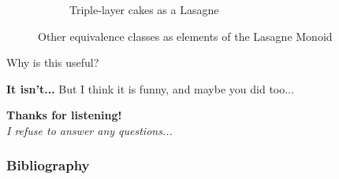 \documentclass{beamer}
\begin{document}
\begin{frame}
\begin{figure}
\begin{subfigure}{.24\textwidth}
          \caption{\label{fig:cake-lasagne}Triple-layer cakes as a Lasagne}
        \end{subfigure}
        \caption{\label{fig:lasagne-subclasses}Other equivalence classes as elements of the Lasagne Monoid}
    \end{figure}
\end{frame}

\begin{frame}{Why is this useful?}
    \begin{center}
        \Huge\textbf{It isn't...}
        \vskip 2cm
        \pause
        \small{But I think it is funny, and maybe you did too...}
    \end{center}
\end{frame}

\begin{frame}
    \begin{center}
        \Huge\textbf{Thanks for listening!} \\
        \vskip 1cm
        \pause
        \Large\textit{I refuse to answer any questions...}
    \end{center}
\end{frame}


%         
%         
\begin{frame}[t,allowframebreaks]
\frametitle{Bibliography}
\printbibliography[heading=none]
\end{frame}
\end{document}
